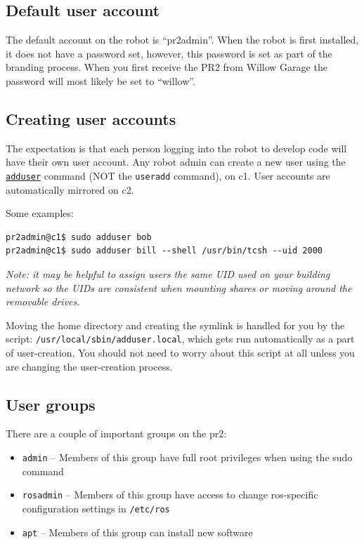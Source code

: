 \subsection{Default user account}
The default account on the robot is ``pr2admin''.  When the robot is
first installed, it does not have a password set, however, this
password is set as part of the branding process.  When you first
receive the PR2 from Willow Garage the password will most likely be
set to ``willow''.

\subsection{Creating user accounts}
The expectation is that each person logging into the robot to develop
code will have their own user account.  Any robot admin can create a
new user using the
\texttt{\href{http://unixhelp.ed.ac.uk/CGI/man-cgi?adduser}{adduser}}
command (NOT the \texttt{useradd} command), on c1.  User accounts are
automatically mirrored on c2.

Some examples:
\begin{verbatim}
pr2admin@c1$ sudo adduser bob
pr2admin@c1$ sudo adduser bill --shell /usr/bin/tcsh --uid 2000
\end{verbatim}

\textit{Note: it may be helpful to assign users the same UID used on
  your building network so the UIDs are consistent when mounting shares
  or moving around the removable drives.}

Moving the home directory and creating the symlink is handled for you
by the script: \texttt{/usr/local/sbin/adduser.local}, which gets run
automatically as a part of user-creation.  You should not need to
worry about this script at all unless you are changing the
user-creation process.

\subsection{User groups}
There are a couple of important groups on the pr2:
\begin{itemize}
\item \texttt{admin} -- Members of this group have full root privileges when using the sudo command
\item \texttt{rosadmin} -- Members of this group have access to change ros-specific configuration settings in \texttt{/etc/ros}
\item \texttt{apt} -- Members of this group can install new software
\end{itemize}

